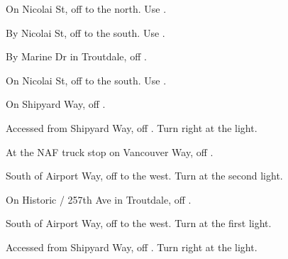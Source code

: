 

\begin{LocationList}

On Nicolai St, off  to the north. Use  .

By Nicolai St, off  to the south. Use  .

By Marine Dr in Troutdale, off  .

\Location{\GarageHQ \Garage}
On Nicolai St, off  to the south. Use  .

On Shipyard Way, off  .

Accessed from Shipyard Way, off  . Turn right at the light.

At the NAF truck stop on Vancouver Way, off  .

South of Airport Way, off   to the west. Turn at the second light.

On Historic  / 257th Ave in Troutdale, off  .

South of Airport Way, off   to the west. Turn at the first light.

Accessed from Shipyard Way, off  . Turn right at the light.

\end{LocationList}
